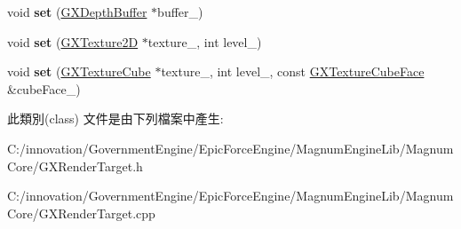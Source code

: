 \begin{DoxyCompactItemize}
\item 
void {\bfseries set} (\hyperlink{class_i_dream_sky_1_1_g_x_depth_buffer}{G\+X\+Depth\+Buffer} $\ast$buffer\+\_\+)\hypertarget{class_i_dream_sky_1_1_g_x_render_target_aafa4394a8e6cd0544eae0059f3243c06}{}\label{class_i_dream_sky_1_1_g_x_render_target_aafa4394a8e6cd0544eae0059f3243c06}

\item 
void {\bfseries set} (\hyperlink{class_i_dream_sky_1_1_g_x_texture2_d}{G\+X\+Texture2D} $\ast$texture\+\_\+, int level\+\_\+)\hypertarget{class_i_dream_sky_1_1_g_x_render_target_a4152b10777bc5a4ff2218fae26f81047}{}\label{class_i_dream_sky_1_1_g_x_render_target_a4152b10777bc5a4ff2218fae26f81047}

\item 
void {\bfseries set} (\hyperlink{class_i_dream_sky_1_1_g_x_texture_cube}{G\+X\+Texture\+Cube} $\ast$texture\+\_\+, int level\+\_\+, const \hyperlink{class_i_dream_sky_1_1_g_x_texture_cube_face}{G\+X\+Texture\+Cube\+Face} \&cube\+Face\+\_\+)\hypertarget{class_i_dream_sky_1_1_g_x_render_target_a8df73a108d64222336114a037a9beb08}{}\label{class_i_dream_sky_1_1_g_x_render_target_a8df73a108d64222336114a037a9beb08}

\end{DoxyCompactItemize}


此類別(class) 文件是由下列檔案中產生\+:\begin{DoxyCompactItemize}
\item 
C\+:/innovation/\+Government\+Engine/\+Epic\+Force\+Engine/\+Magnum\+Engine\+Lib/\+Magnum\+Core/G\+X\+Render\+Target.\+h\item 
C\+:/innovation/\+Government\+Engine/\+Epic\+Force\+Engine/\+Magnum\+Engine\+Lib/\+Magnum\+Core/G\+X\+Render\+Target.\+cpp\end{DoxyCompactItemize}
